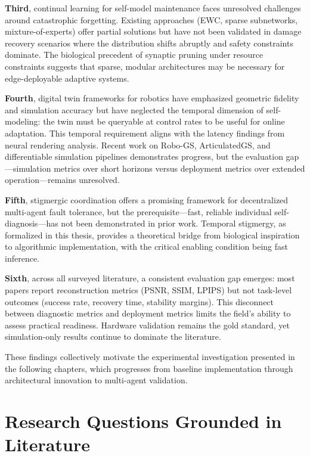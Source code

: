 \documentclass[12pt,a4paper,oneside]{report}
\begin{document}
\textbf{Third}, continual learning for self-model maintenance faces unresolved challenges around catastrophic forgetting. Existing approaches (EWC, sparse subnetworks, mixture-of-experts) offer partial solutions but have not been validated in damage recovery scenarios where the distribution shifts abruptly and safety constraints dominate. The biological precedent of synaptic pruning under resource constraints suggests that sparse, modular architectures may be necessary for edge-deployable adaptive systems.

\textbf{Fourth}, digital twin frameworks for robotics have emphasized geometric fidelity and simulation accuracy but have neglected the temporal dimension of self-modeling: the twin must be queryable at control rates to be useful for online adaptation. This temporal requirement aligns with the latency findings from neural rendering analysis. Recent work on Robo-GS, ArticulatedGS, and differentiable simulation pipelines demonstrates progress, but the evaluation gap---simulation metrics over short horizons versus deployment metrics over extended operation---remains unresolved.

\textbf{Fifth}, stigmergic coordination offers a promising framework for decentralized multi-agent fault tolerance, but the prerequisite---fast, reliable individual self-diagnosis---has not been demonstrated in prior work. Temporal stigmergy, as formalized in this thesis, provides a theoretical bridge from biological inspiration to algorithmic implementation, with the critical enabling condition being fast inference.

\textbf{Sixth}, across all surveyed literature, a consistent evaluation gap emerges: most papers report reconstruction metrics (PSNR, SSIM, LPIPS) but not task-level outcomes (success rate, recovery time, stability margins). This disconnect between diagnostic metrics and deployment metrics limits the field's ability to assess practical readiness. Hardware validation remains the gold standard, yet simulation-only results continue to dominate the literature.

These findings collectively motivate the experimental investigation presented in the following chapters, which progresses from baseline implementation through architectural innovation to multi-agent validation.

\section{Research Questions Grounded in Literature}
\end{document}

